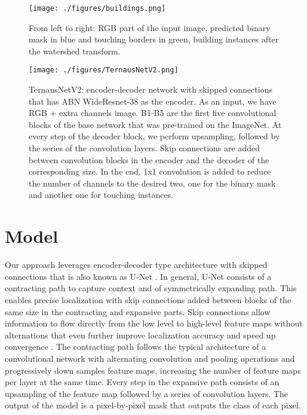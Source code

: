 \documentclass[10pt,twocolumn,letterpaper]{article}
\begin{document}
\begin{figure}[t]
\begin{center}
\texttt{[image: ./figures/buildings.png]}
\end{center}
   \caption{From left to right: RGB part of the input image, predicted binary mask in blue and touching borders  in green, building instances after the watershed transform.}
\label{fig:buildings}
\end{figure}


\begin{figure*}
\begin{center}
\texttt{[image: ./figures/TernausNetV2.png]}
\end{center}
 \caption{TernausNetV2: encoder-decoder network with skipped connections that has ABN WideResnet-38 as the encoder. As an input, we have RGB + extra channels image. B1-B5 are the first five convolutional blocks of the base network that was pre-trained on the ImageNet. At every step of the decoder block, we perform upsampling, followed by the series of the convolution layers. Skip connections are added between convolution blocks in the encoder and the decoder of the corresponding size. In the end, 1x1 convolution is added to reduce the number of channels to the desired two, one for the binary mask and another one for touching instances.
   }
\label{fig::fpn}
\end{figure*}

\section{Model}
Our approach leverages encoder-decoder type architecture with skipped connections that is also known as U-Net \cite{ronneberger2015u}. In general, U-Net consists of a contracting path to capture context and of symmetrically expanding path. This enables precise localization with skip connections added between blocks of the same size in the contracting and expansive parts. Skip connections allow information to flow directly from the low level to high-level feature maps without alternations that even further improve localization accuracy and speed up convergence  \cite{ronneberger2015u}. The contracting path follows the typical architecture of a convolutional network with alternating convolution and pooling operations and progressively down samples feature maps, increasing the number of feature maps per layer at the same time. Every step in the expansive path consists of an upsampling of the feature map followed by a series of convolution layers. The output of the model is a pixel-by-pixel mask that outputs the class of each pixel. 
\end{document}
